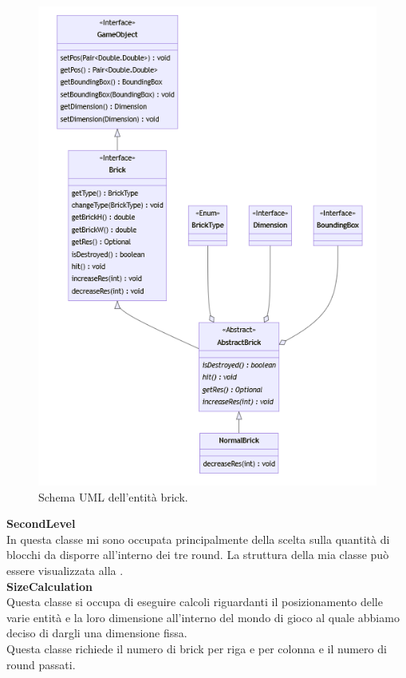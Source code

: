 \documentclass[a4paper,12pt]{report}
\begin{document}
\begin{figure}[H]
    \centering{}
    \includegraphics[scale=0.6]{images/Brick.png}
    \caption{Schema UML dell'entità brick.}
    \label{images:Brick}
\end{figure}
\textbf{SecondLevel}\\
In questa classe mi sono occupata principalmente della scelta sulla quantità di blocchi da disporre all'interno dei tre round. La struttura della mia classe può essere
visualizzata alla .\\
\textbf{SizeCalculation}\\
Questa classe si occupa di eseguire calcoli riguardanti il posizionamento delle varie entità e la loro dimensione all'interno del mondo di gioco al
quale abbiamo deciso di dargli una dimensione fissa.
\\Questa classe richiede il numero di brick per riga e per colonna e il numero di round passati.
\end{document}
